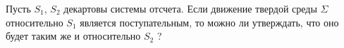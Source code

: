 Пусть $S_{1}$, $S_{2}$  декартовы системы отсчета. Если движение твердой среды $\Sigma$
относительно $S_{1}$ является поступательным, то можно ли утверждать,
что оно будет таким же и относительно $S_{2}$ ?
